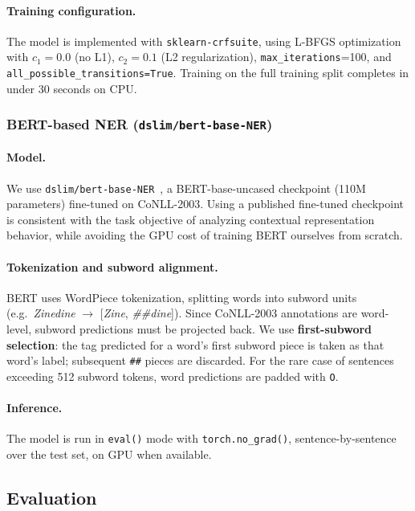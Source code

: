 \documentclass[11pt,a4paper]{article}
\begin{document}
\paragraph{Training configuration.}
The model is implemented with \texttt{sklearn-crfsuite}, using L-BFGS
optimization with $c_1=0.0$ (no L1), $c_2=0.1$ (L2 regularization),
\texttt{max\_iterations}=100, and \texttt{all\_possible\_transitions=True}.
Training on the full training split completes in under 30 seconds on CPU.

\subsubsection{BERT-based NER (\texttt{dslim/bert-base-NER})}

\paragraph{Model.}
We use \texttt{dslim/bert-base-NER}~\cite{dslim2021}, a BERT-base-uncased
checkpoint (110M parameters) fine-tuned on CoNLL-2003. Using a published
fine-tuned checkpoint is consistent with the task objective of analyzing
contextual representation behavior, while avoiding the GPU cost of training
BERT ourselves from scratch.

\paragraph{Tokenization and subword alignment.}
BERT uses WordPiece tokenization, splitting words into subword units (e.g.\
\emph{Zinedine} $\rightarrow$ [\emph{Zine}, \emph{\#\#dine}]). Since
CoNLL-2003 annotations are word-level, subword predictions must be projected
back. We use \textbf{first-subword selection}: the tag predicted for a word's
first subword piece is taken as that word's label; subsequent \texttt{\#\#}
pieces are discarded. For the rare case of sentences exceeding 512 subword
tokens, word predictions are padded with \texttt{O}.

\paragraph{Inference.}
The model is run in \texttt{eval()} mode with \texttt{torch.no\_grad()},
sentence-by-sentence over the test set, on GPU when available.

\subsection{Evaluation}
\end{document}
